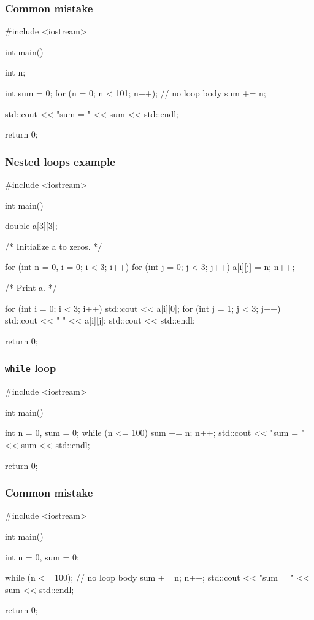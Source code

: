\documentclass[12pt,letterpaper,twoside]{article}
\begin{document}
\subsubsection{Common mistake}
\begin{cpp}
#include <iostream>

int main() {
  int n;

  int sum = 0;
  for (n = 0; n < 101; n++); // no loop body
  {
    sum += n;
  }

  std::cout << "sum = " << sum << std::endl;

  return 0;
}
\end{cpp}

\subsubsection{Nested loops example}
\begin{cpp}

#include <iostream>

int main() {
  double a[3][3];

  /* Initialize a to zeros. */

  for (int n = 0, i = 0; i < 3; i++) {
    for (int j = 0; j < 3; j++) {
      a[i][j] = n;
      n++;
    }
  }

  /* Print a. */

  for (int i = 0; i < 3; i++) {
    std::cout << a[i][0];
    for (int j = 1; j < 3; j++) {
      std::cout << " " << a[i][j];
    }
    std::cout << std::endl;
  }

  return 0;
}
\end{cpp}

\subsubsection{\texorpdfstring{\texttt{while} loop}{while loop}}
\begin{cpp}

#include <iostream>

int main() {
  int n = 0, sum = 0;
  while (n <= 100) {
    sum += n;
    n++;
  }
  std::cout << "sum = " << sum << std::endl;

  return 0;
}
\end{cpp}

\subsubsection{Common mistake}
\begin{cpp}
#include <iostream>

int main() {
  int n = 0, sum = 0;

  while (n <= 100); // no loop body
  {
    sum += n;
    n++;
  }
  std::cout << "sum = " << sum << std::endl;

  return 0;
}
\end{cpp}
\end{document}
